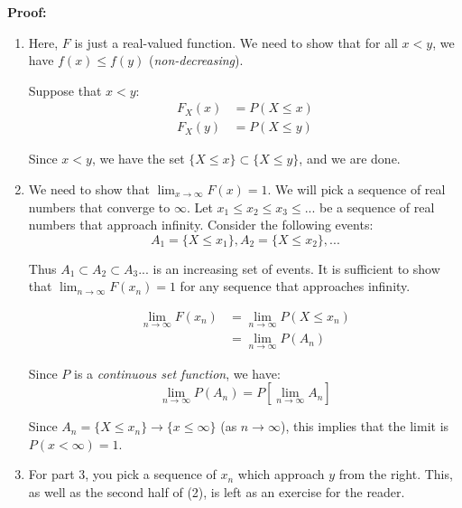 \documentclass{article}
\begin{document}
\textbf{Proof:}
\begin{enumerate}
    \item Here, $F$ is just a real-valued function. We need to show that for all $x<y$, we have $f(x) \leq f(y)$ (\textit{non-decreasing}). 
    
    Suppose that $x<y$:
    \begin{equation*}
    \begin{split}
        F_X(x) &= P(X\leq x)\\
        F_X(y) &= P(X \leq y)
    \end{split}
    \end{equation*}
    
    Since $x<y$, we have the set $\{X \leq x\} \subset \{X \leq y\}$, and we are done.
    
    \item We need to show that $\lim_{x\to\infty}F(x) = 1$. We will pick a sequence of real numbers that converge to $\infty$. Let $x_1 \leq x_2 \leq x_3 \leq ...$ be a sequence of real numbers that approach infinity. Consider the following events:
    \begin{equation*}
        A_1 = \{X \leq x_1\}, A_2 = \{X \leq x_2\},...
    \end{equation*}
    
    Thus $A_1 \subset A_2 \subset A_3 ...$ is an increasing set of events. It is sufficient to show that $\lim_{n\to\infty} F(x_n) = 1$ for any sequence that approaches infinity.
    
    \begin{equation*}
        \begin{split}
            \lim_{n\to\infty} F(x_n) &= \lim_{n\to\infty} P(X \leq x_n) \\
            &= \lim_{n\to\infty} P(A_n) 
        \end{split}
    \end{equation*}
    
    Since $P$ is a \textit{continuous set function}, we have:
    \begin{equation*}
        \lim_{n\to\infty} P(A_n) = P \left[ \lim_{n\to\infty} A_n \right]
    \end{equation*}
    
    Since $A_n = \{X \leq x_n\} \rightarrow \{x \leq \infty\}$ (as $n\to\infty$), this implies that the limit is $P(x< \infty) = 1$.
    \item For part 3, you pick a sequence of $x_n$ which approach $y$ from the right. This, as well as the second half of (2), is left as an exercise for the reader.
\end{enumerate}
\end{document}
